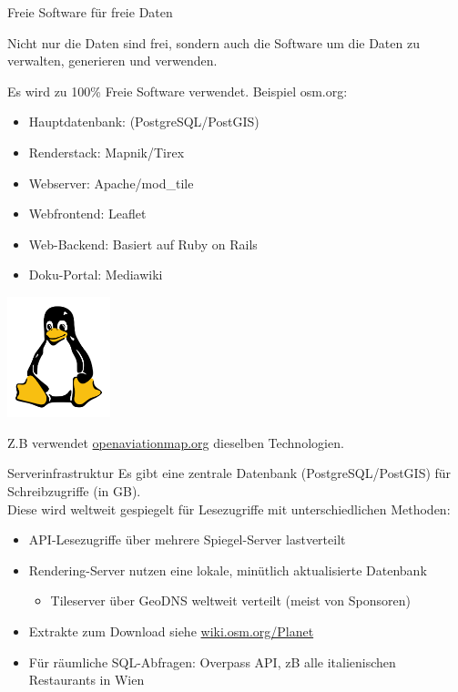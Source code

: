 \documentclass{beamer}
\begin{document}
\begin{frame}{Freie Software für freie Daten}

Nicht nur die Daten sind frei, sondern auch die Software um die Daten zu verwalten, generieren und verwenden.

\vspace{0.6cm}

Es wird zu 100\% Freie Software verwendet. Beispiel osm.org:
\begin{itemize}
  \item Hauptdatenbank: (PostgreSQL/PostGIS) 
  \item Renderstack: Mapnik/Tirex
  \item Webserver: Apache/mod\_tile
  \item Webfrontend: Leaflet
  \item Web-Backend: Basiert auf Ruby on Rails
  \item Doku-Portal: Mediawiki
\end{itemize}


  \vspace*{-3cm}
 \hfill \includegraphics[width=3cm]{tux.png}


\pause

Z.B verwendet \href{http://openaviationmap.org/}{openaviationmap.org} dieselben Technologien.

\end{frame}


\begin{frame}{Serverinfrastruktur}
Es gibt eine zentrale Datenbank (PostgreSQL/PostGIS) für Schreibzugriffe (in GB).\\
\pause
Diese wird weltweit gespiegelt für Lesezugriffe mit unterschiedlichen Methoden:

\begin{itemize}
  \item API-Lesezugriffe über mehrere Spiegel-Server lastverteilt
  \item Rendering-Server nutzen eine lokale, minütlich aktualisierte Datenbank
  \begin{itemize}
    \item Tileserver über GeoDNS weltweit verteilt (meist von Sponsoren)
  \end{itemize}
  \item Extrakte zum Download siehe \href{http://wiki.osm.org/Planet}{wiki.osm.org/Planet}
  \item Für räumliche SQL-Abfragen: Overpass API, zB alle italienischen Restaurants in Wien
\end{itemize}

\end{frame}
\end{document}
